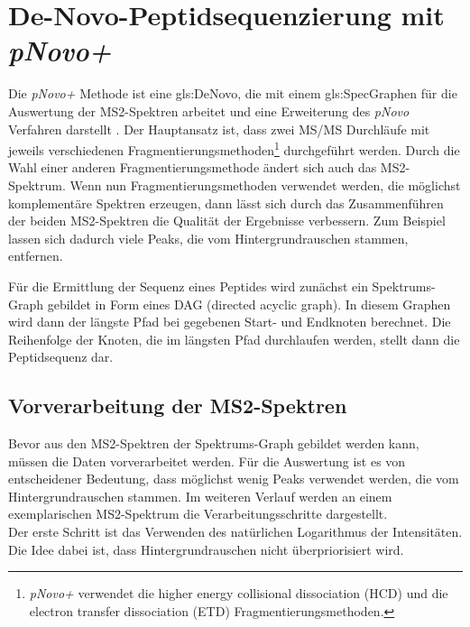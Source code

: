 \documentclass[a4paper, 12pt]{article}
\newcommand{\dashAndSpace}{\textendash \space}
\begin{document}
\section{De-Novo-Peptidsequenzierung mit \emph{pNovo+}}\label{s:pNovoPlusSeq}
Die \emph{pNovo+} Methode ist eine \gls{gls:DeNovo}, die mit einem \gls{gls:SpecGraph}en für die Auswertung der MS2-Spektren arbeitet und eine Erweiterung des \emph{pNovo} Verfahren darstellt \cite{pNovo}. Der Hauptansatz ist, dass zwei MS/MS Durchläufe mit jeweils verschiedenen Fragmentierungsmethoden\footnote{\emph{pNovo+} verwendet die higher energy
collisional dissociation (HCD) und die electron transfer dissociation (ETD) Fragmentierungsmethoden.} durchgeführt werden. Durch die Wahl einer anderen Fragmentierungsmethode ändert sich auch das MS2-Spektrum. Wenn nun Fragmentierungsmethoden verwendet werden, die möglichst komplementäre Spektren erzeugen, dann lässt sich durch das Zusammenführen der beiden MS2-Spektren die Qualität der Ergebnisse verbessern. Zum Beispiel lassen sich dadurch viele Peaks, die vom Hintergrundrauschen stammen, entfernen.

Für die Ermittlung der Sequenz eines Peptides wird zunächst ein Spektrums-Graph gebildet \dashAndSpace in Form eines DAG (directed acyclic graph). In diesem Graphen wird dann der längste Pfad bei gegebenen Start- und Endknoten berechnet. Die Reihenfolge der Knoten, die im längsten Pfad durchlaufen werden, stellt dann die Peptidsequenz dar.

\subsection{Vorverarbeitung der MS2-Spektren}\label{ss:Vorverarbeitung}
Bevor aus den MS2-Spektren der Spektrums-Graph gebildet werden kann, müssen die Daten vorverarbeitet werden. Für die Auswertung ist es von entscheidener Bedeutung, dass möglichst wenig Peaks verwendet werden, die vom Hintergrundrauschen stammen. Im weiteren Verlauf werden an einem exemplarischen MS2-Spektrum die Verarbeitungsschritte dargestellt.\\

Der erste Schritt ist das Verwenden des natürlichen Logarithmus der Intensitäten. Die Idee dabei ist, dass Hintergrundrauschen nicht überpriorisiert wird.
\end{document}
